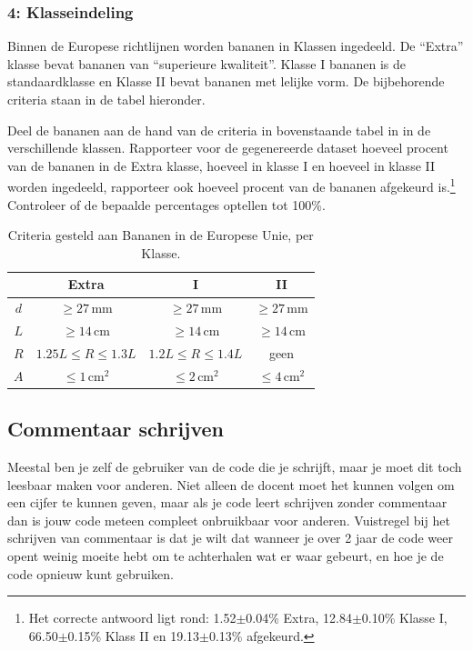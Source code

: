 \documentclass[a4paper,11pt, fleqn]{article}
\begin{document}
\subsubsection*{4: Klasseindeling}
Binnen de Europese richtlijnen worden bananen in Klassen ingedeeld. De ``Extra'' klasse bevat bananen van ``superieure kwaliteit''. Klasse I bananen is de standaardklasse en Klasse II bevat bananen met lelijke vorm. De bijbehorende criteria staan in de tabel hieronder.

Deel de bananen aan de hand van de criteria in bovenstaande tabel in in de verschillende klassen. Rapporteer voor de gegenereerde dataset hoeveel procent van de bananen in de Extra klasse, hoeveel in klasse I en hoeveel in klasse II worden ingedeeld, rapporteer ook hoeveel procent van de bananen afgekeurd is.\footnote{Het correcte antwoord ligt rond: 1.52$\pm$0.04\% Extra, 12.84$\pm$0.10\% Klasse I, 66.50$\pm$0.15\% Klass II en 19.13$\pm$0.13\% afgekeurd.} Controleer of de bepaalde percentages optellen tot 100\%.

\begin{table}[!ht]
	\centering
	\caption{Criteria gesteld aan Bananen in de Europese Unie, per Klasse.}
	\begin{tabular}{c c c c}
		&\textbf{Extra} & \textbf{I} & \textbf{II}\\
		\hline
		$d$ & $\geq 27\,\textrm{mm}$     &$\geq 27\,\textrm{mm}$    &$\geq 27\,\textrm{mm}$\\
		$L$ & $\geq 14\,\textrm{cm}$     &$\geq 14\,\textrm{cm}$    &$\geq 14\,\textrm{cm}$\\
		$R$ & $1.25 L \leq R \leq 1.3 L$ &$1.2 L \leq R \leq 1.4 L$ & geen\\
		$A$ & $\leq 1\,\textrm{cm}^2$    &$\leq 2\,\textrm{cm}^2$   & $\leq 4\,\textrm{cm}^2$\\
		\hline
	\end{tabular}
\end{table}

\subsection{Commentaar schrijven}
Meestal ben je zelf de gebruiker van de code die je schrijft, maar je moet dit toch leesbaar maken voor anderen. Niet alleen de docent moet het kunnen volgen om een cijfer te kunnen geven, maar als je code leert schrijven zonder commentaar dan is jouw code meteen compleet onbruikbaar voor anderen. Vuistregel bij het schrijven van commentaar is dat je wilt dat wanneer je over 2 jaar de code weer opent weinig moeite hebt om te achterhalen wat er waar gebeurt, en hoe je de code opnieuw kunt gebruiken.
\end{document}
